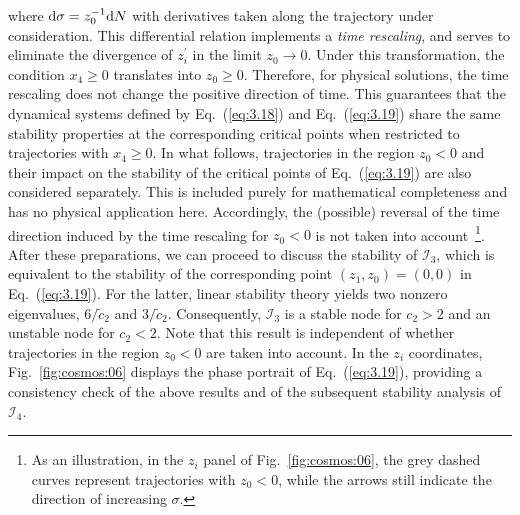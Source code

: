 \documentclass[aps,prd,twocolumn]{revtex4-2}
\newcommand\dx{{\rm d}}
\begin{document}
where $\dx\sigma=z_0^{-1}\dx N$ with derivatives taken along the trajectory under consideration. This differential relation implements a \textit{time rescaling}, and serves to eliminate the divergence of $z_i^\prime$ in the limit $z_0\rightarrow0$. Under this transformation, the condition $x_4\geqslant0$ translates into $z_0\geqslant0$. Therefore, for physical solutions, the time rescaling does not change the positive direction of time. This guarantees that the dynamical systems defined by Eq.~(\ref{eq:3.18}) and Eq.~(\ref{eq:3.19}) share the same stability properties at the corresponding critical points when restricted to trajectories with $x_4\geqslant0$. In what follows, trajectories in the region $z_0<0$ and their impact on the stability of the critical points of Eq.~(\ref{eq:3.19}) are also considered separately. This is included purely for mathematical completeness and has no physical application here. Accordingly, the (possible) reversal of the time direction induced by the time rescaling for $z_0<0$ is not taken into account~\footnote{As an illustration, in the $z_i$ panel of Fig.~\ref{fig:cosmos:06}, the grey dashed curves represent trajectories with $z_0<0$, while the arrows still indicate the direction of increasing $\sigma$.}. After these preparations, we can proceed to discuss the stability of $\mathcal{I}_3$, which is equivalent to the stability of the corresponding point $(z_1,z_0)=(0,0)$ in Eq.~(\ref{eq:3.19}). For the latter, linear stability theory yields two nonzero eigenvalues, $6/\tilde{c}_2$ and $3/\tilde{c}_2$. Consequently, $\mathcal{I}_3$ is a stable node for $c_2>2$ and an unstable node for $c_2<2$. Note that this result is independent of whether trajectories in the region $z_0<0$ are taken into account. In the $z_i$ coordinates, Fig.~\ref{fig:cosmos:06} displays the phase portrait of Eq.~(\ref{eq:3.19}), providing a consistency check of the above results and of the subsequent stability analysis of $\mathcal{I}_4$.
\end{document}
